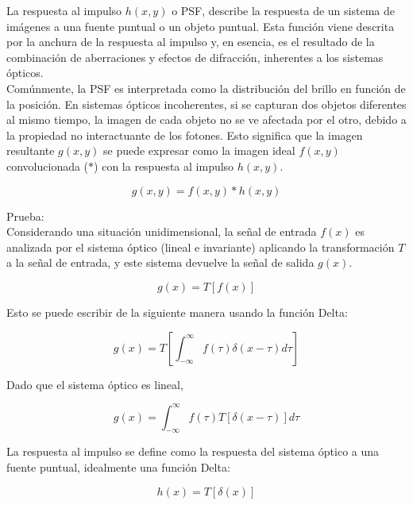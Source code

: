 \documentclass[12pt]{article}
\numberwithin{equation}{section}%
\newcommand{\lightit}[1]{{\lightitfont #1}}
\begin{document}
La respuesta al impulso \(h(x, y)\) o PSF, describe la respuesta de un sistema de imágenes a una fuente puntual o un objeto puntual. Esta función viene descrita por la anchura de la respuesta al impulso y, en esencia, es el resultado de la combinación de aberraciones y efectos de difracción, inherentes a los sistemas ópticos.\\

Comúnmente, la PSF es interpretada como la distribución del brillo en función de la posición. En sistemas ópticos incoherentes, si se capturan dos objetos diferentes al mismo tiempo, la imagen de cada objeto no se ve afectada por el otro, debido a la propiedad no interactuante de los fotones. Esto significa que la imagen resultante \( g(x, y) \) se puede expresar como la imagen ideal \( f(x, y) \) convolucionada (\(\ast\)) con la respuesta al impulso \( h(x, y) \).
 
\begin{equation}
    g(x, y) = f(x, y) \ast h(x, y)
    \label{eq: convolucion}
\end{equation}

\newpage
\lightit{Prueba:}\\

Considerando una situación unidimensional, la señal de entrada \( f(x) \) es analizada por el sistema óptico (lineal e invariante) aplicando la transformación \( T \) a la señal de entrada, y este sistema devuelve la señal de salida \( g(x) \).

\begin{equation*}
    g(x) = T[f(x)]
\end{equation*}

Esto se puede escribir de la siguiente manera usando la función Delta:

\begin{equation*}
    g(x) = T \left[ \int_{-\infty}^{\infty} f(\tau) \delta(x - \tau) d\tau \right]
\end{equation*}

Dado que el sistema óptico es lineal,

\begin{equation*}
    g(x) = \int_{-\infty}^{\infty} f(\tau) T[\delta(x - \tau)] d\tau
\end{equation*}

La respuesta al impulso se define como la respuesta del sistema óptico a una fuente puntual, idealmente una función Delta:

\begin{equation*}
    h(x) = T[\delta(x)]
\end{equation*}
\end{document}
